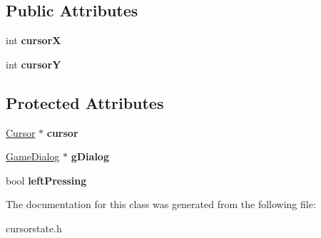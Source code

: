 \subsection*{Public Attributes}
\begin{DoxyCompactItemize}
\item 
\mbox{\label{classgame_1_1CursorState_aabc0e0c8a7e70d431626a3fd19314dc4}} 
int {\bfseries cursorX}
\item 
\mbox{\label{classgame_1_1CursorState_a160547da115f259e1f4d9ba7868da1a4}} 
int {\bfseries cursorY}
\end{DoxyCompactItemize}
\subsection*{Protected Attributes}
\begin{DoxyCompactItemize}
\item 
\mbox{\label{classgame_1_1CursorState_af2962def7d428bcf7e5c685cd75a84fd}} 
\hyperlink{classgame_1_1Cursor}{Cursor} $\ast$ {\bfseries cursor}
\item 
\mbox{\label{classgame_1_1CursorState_a37e0c0b43e6bdda0a4c731640f7b8191}} 
\hyperlink{classgame_1_1GameDialog}{Game\+Dialog} $\ast$ {\bfseries g\+Dialog}
\item 
\mbox{\label{classgame_1_1CursorState_aab409304c8cd88f067dda15b96d7f703}} 
bool {\bfseries left\+Pressing}
\end{DoxyCompactItemize}


The documentation for this class was generated from the following file\+:\begin{DoxyCompactItemize}
\item 
cursorstate.\+h\end{DoxyCompactItemize}
